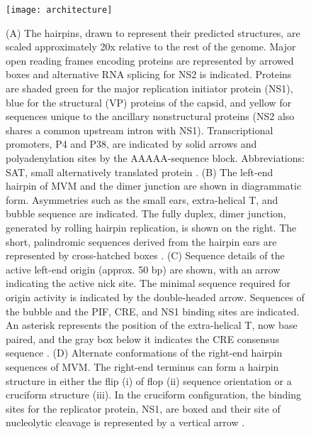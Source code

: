 \begin{figure}
  \centering
  \texttt{[image: architecture]}
  \vspace{-8em}
  \caption[Genome architecture of minute virus of mice (MVM).]
   {(A) The hairpins, drawn to represent their predicted structures, are scaled approximately 20x relative to the rest of the genome. Major open reading frames encoding proteins are represented by arrowed boxes and alternative RNA splicing for NS2 is indicated. Proteins are shaded green for the major replication initiator protein (NS1), blue for the structural (VP) proteins of the capsid, and yellow for sequences unique to the ancillary nonstructural proteins (NS2 also shares a common upstream intron with NS1). Transcriptional promoters, P4 and P38, are indicated by solid arrows and polyadenylation sites by the AAAAA-sequence block. Abbreviations: SAT, small alternatively translated protein \cite{}. (B) The left-end hairpin of MVM and the dimer junction are shown in diagrammatic form. Asymmetries such as the small ears, extra-helical T, and bubble sequence are indicated. The fully duplex, dimer junction, generated by rolling hairpin replication, is shown on the right. The short, palindromic sequences derived from the hairpin ears are represented by cross-hatched boxes \cite{pmid12885883, pmid16928767}. (C) Sequence details of the active left-end origin (approx. 50 bp) are shown, with an arrow indicating the active nick site. The minimal sequence required for origin activity is indicated by the double-headed arrow. Sequences of the bubble and the PIF, CRE, and NS1 binding sites are indicated. An asterisk represents the position of the extra-helical T, now base paired, and the gray box below it indicates the CRE consensus sequence \cite{pmid12885883}. (D) Alternate conformations of the right-end hairpin sequences of MVM. The right-end terminus can form a hairpin structure in either the flip (i) of flop (ii) sequence orientation or a cruciform structure (iii). In the cruciform configuration, the binding sites for the replicator protein, NS1, are boxed and their site of nucleolytic cleavage is represented by a vertical arrow \cite{pmid8614999}.
} 

\end{figure}




